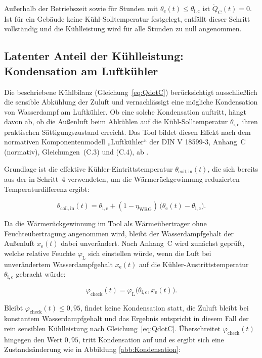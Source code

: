 \documentclass{scrreprt}
\begin{document}
Außerhalb der Betriebszeit sowie für Stunden mit
$\theta_{\mathrm{e}}(t) \leq \theta_{\mathrm{i,c}}$ ist $\dot
Q_{\mathrm{C}}(t) = 0$. Ist für ein Gebäude keine Kühl-Solltemperatur
festgelegt, entfällt dieser Schritt vollständig und die Kühlleistung
wird für alle Stunden zu null angenommen.

\subsection{Latenter Anteil der Kühlleistung: Kondensation am Luftkühler}
Die beschriebene Kühlbilanz (Gleichung~\eqref{eq:QdotC})
berücksichtigt ausschließlich die sensible Abkühlung der Zuluft und
vernachlässigt eine mögliche Kondensation von Wasserdampf am
Luftkühler. Ob eine solche Kondensation auftritt, hängt davon ab, ob
die Außenluft beim Abkühlen auf die Kühl-Solltemperatur
$\theta_{\mathrm{i,c}}$ ihren praktischen Sättigungszustand erreicht.
Das Tool bildet diesen Effekt nach dem normativen Komponentenmodell
„Luftkühler“ der DIN V 18599-3, Anhang~C (normativ),
Gleichungen~(C.3) und (C.4), ab \parencite{DIN185993}.

Grundlage ist die effektive Kühler-Eintrittstemperatur
$\theta_{\mathrm{coil,in}}(t)$, die sich bereits aus der in Schritt~4
verwendeten, um die Wärmerückgewinnung reduzierten
Temperaturdifferenz ergibt:

\begin{equation}\label{eq:thetacoilin}
    \theta_{\mathrm{coil,in}}(t) = \theta_{\mathrm{i,c}} + (1-\eta_{\mathrm{WRG}}) \, \bigl(\theta_{\mathrm{e}}(t) - \theta_{\mathrm{i,c}}\bigr).
\end{equation}

Da die Wärmerückgewinnung im Tool als Wärmeübertrager ohne
Feuchteübertragung angenommen wird, bleibt der Wasserdampfgehalt der
Außenluft $x_{\mathrm{e}}(t)$ dabei unverändert. Nach Anhang~C wird
zunächst geprüft, welche relative Feuchte $\varphi_{\mathrm{L}}$ sich
einstellen würde, wenn die Luft bei unverändertem Wasserdampfgehalt
$x_{\mathrm{e}}(t)$ auf die Kühler-Austrittstemperatur
$\theta_{\mathrm{i,c}}$ gebracht würde:

\begin{equation}\label{eq:phicheck}
    \varphi_{\mathrm{check}}(t) = \varphi_{\mathrm{L}}\bigl(\theta_{\mathrm{i,c}}, x_{\mathrm{e}}(t)\bigr).
\end{equation}

Bleibt $\varphi_{\mathrm{check}}(t) \leq 0{,}95$, findet keine
Kondensation statt, die Zuluft bleibt bei konstantem
Wasserdampfgehalt und das
Ergebnis entspricht in diesem Fall der rein sensiblen Kühlleistung
nach Gleichung~\eqref{eq:QdotC}. Überschreitet $\varphi_{\mathrm{check}}(t)$
hingegen den Wert $0{,}95$, tritt Kondensation auf und es ergibt sich eine Zustandsänderung wie in Abbildung \ref{abb:Kondensation}:
\end{document}
